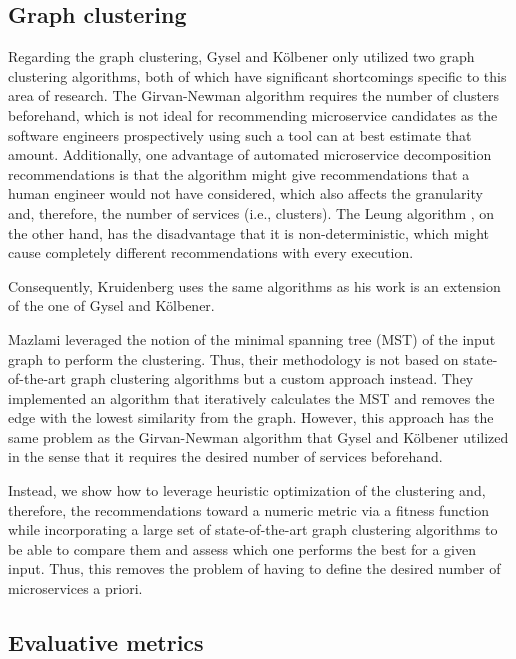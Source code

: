 \documentclass[12pt,a4paper]{report}
\begin{document}
\subsection{Graph clustering}

Regarding the graph clustering, Gysel and K{\"o}lbener \cite{gysel2016service}
only utilized two graph clustering algorithms, both of which have significant
shortcomings specific to this area of research. The Girvan-Newman algorithm
\cite{girvan2002community} requires the number of clusters beforehand, which is
not ideal for recommending microservice candidates as the software engineers
prospectively using such a tool can at best estimate that amount. Additionally,
one advantage of automated microservice decomposition recommendations is that
the algorithm might give recommendations that a human engineer would not have
considered, which also affects the granularity and, therefore, the number of
services (i.e., clusters). The Leung algorithm \cite{leung2009community}, on
the other hand, has the disadvantage that it is non\hyp deterministic, which
might cause completely different recommendations with every execution.

Consequently, Kruidenberg \cite{kruidenberg2018monoliths} uses the same
algorithms as his work is an extension of the one of Gysel and K{\"o}lbener.

Mazlami \cite{mazlami2017extraction} leveraged the notion of the minimal
spanning tree (MST) of the input graph to perform the clustering. Thus, their
methodology is not based on state-of-the-art graph clustering algorithms but a
custom approach instead. They implemented an algorithm that iteratively
calculates the MST and removes the edge with the lowest similarity from the
graph. However, this approach has the same problem as the Girvan-Newman
algorithm \cite{girvan2002community} that Gysel and K{\"o}lbener utilized in
the sense that it requires the desired number of services beforehand.

Instead, we show how to leverage heuristic optimization of the clustering and,
therefore, the recommendations toward a numeric metric via a fitness function
while incorporating a large set of state-of-the-art graph clustering algorithms
to be able to compare them and assess which one performs the best for a given
input. Thus, this removes the problem of having to define the desired number of
microservices a priori.


\subsection{Evaluative metrics}
\end{document}

